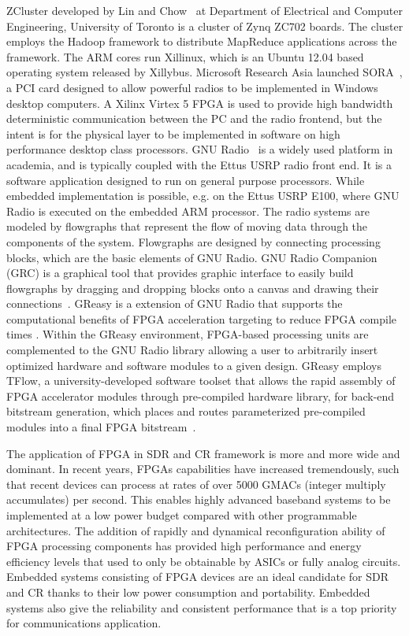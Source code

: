 ZCluster developed by Lin and Chow~\cite{Lin2013} at Department of Electrical and Computer Engineering, University of Toronto is a cluster of Zynq ZC702 boards. The cluster employs the Hadoop framework to distribute MapReduce applications across the framework. The ARM cores run Xillinux, which is an Ubuntu 12.04 based operating system released by Xillybus.
Microsoft Research Asia launched SORA~\cite{tan2011sora}, a PCI card designed to allow powerful radios to be implemented in Windows desktop computers.
A Xilinx Virtex 5 FPGA is used to provide high bandwidth deterministic communication between the PC and the radio frontend, but the intent is for the physical layer to be implemented in software on high performance desktop class processors.
GNU Radio~\cite{gnuradio} is a widely used platform in academia, and is typically coupled with the Ettus USRP radio front end. It is a software application designed to run on general purpose processors. While embedded implementation is possible, e.g. on the Ettus USRP E100, where GNU Radio is executed on the embedded ARM processor. The radio systems are modeled by flowgraphs that represent the flow of moving data through the components of the system. Flowgraphs are designed by connecting processing blocks, which are the basic elements of GNU Radio. GNU Radio Companion (GRC) is a graphical tool that provides graphic interface to easily build flowgraphs by dragging and dropping blocks onto a canvas and drawing their connections~\cite{GRC2009}.
GReasy is a extension of GNU Radio that supports the computational benefits of FPGA acceleration targeting to reduce FPGA compile times \cite{Marlow2014}. Within the GReasy environment, FPGA-based processing units are complemented to the GNU Radio library allowing a user to arbitrarily insert optimized hardware and software modules to a given design. GReasy employs TFlow, a university-developed software toolset that allows the rapid assembly of FPGA accelerator modules through pre-compiled hardware library, for back-end bitstream generation, which places and routes parameterized pre-compiled modules into a final FPGA bitstream~\cite{Love2013}.

The application of FPGA in SDR and CR framework is more and more wide and dominant. In recent years, FPGAs capabilities have increased tremendously, such that recent devices can process at rates of over 5000 GMACs (integer multiply accumulates) per second. This enables highly advanced baseband systems to be implemented at a low power budget compared with other programmable architectures.
The addition of rapidly and dynamical reconfiguration ability of FPGA processing components has provided high performance and energy efficiency levels that used to only be obtainable by ASICs or fully analog circuits. Embedded systems consisting of FPGA devices are an ideal candidate for SDR and CR thanks to their low power consumption and portability.
Embedded systems also give the reliability and consistent performance that is a top priority for communications application.


